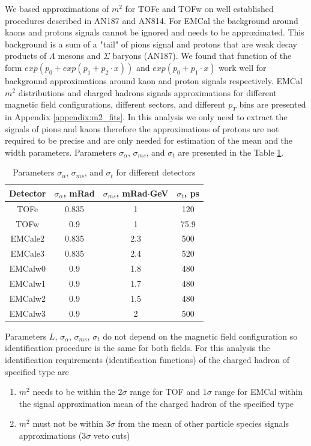 We based approximations of $m^2$ for TOFe and TOFw on well established procedures described in AN187 and AN814. For EMCal the background around kaons and protons signals cannot be ignored and needs to be approximated. This background is a sum of a "tail" of pions signal and protons that are weak decay products of $\Lambda$ mesons and $\Sigma$ baryons (AN187). We found that function of the form $exp(p_0 + exp(p_1 + p_2 \cdot x))$ and $exp(p_0 + p_1 \cdot x)$ work well for background approximations around kaon and proton signals respectively. EMCal $m^2$ distributions and charged hadrons signals approximations for different magnetic field configurations, different sectors, and different $p_T$ bins are presented in Appendix \ref{appendix:m2_fits}. In this analysis we only need to extract the signals of pions and kaons therefore the approximations of protons are not required to be precise and are only needed for estimation of the mean and the width parameters. Parameters $\sigma_\alpha$, $\sigma_{ms}$, and $\sigma_{t}$ are presented in the Table \ref{table:sigma_m2}.

\begin{table}[h!]
	\centering
	\begin{tabular}{c||c|c|c}
		Detector & $\sigma_{\alpha}$, mRad & $\sigma_{ms}$, mRad$\cdot$GeV & $\sigma_{t}$, ps \\
		\hline
		\hline
		TOFe & 0.835 & 1 & 120 \\
		TOFw & 0.9 & 1 & 75.9 \\
		EMCale2 & 0.835 & 2.3 & 500 \\
		EMCale3 & 0.835 & 2.4 & 520 \\
		EMCalw0 & 0.9 & 1.8 & 480 \\
		EMCalw1 & 0.9 & 1.7 & 480 \\
		EMCalw2 & 0.9 & 1.5 & 480 \\
		EMCalw3 & 0.9 & 2 & 500 \\
	\end{tabular}
	\caption{Parameters $\sigma_\alpha$, $\sigma_{ms}$, and $\sigma_{t}$ for different detectors}
	\label{table:sigma_m2}
\end{table}

Parameters $L$, $\sigma_\alpha$, $\sigma_{ms}$, $\sigma_{t}$ do not depend on the magnetic field configuration so identification procedure is the same for both fields. For this analysis the identification requirements (identification functions) of the charged hadron of specified type are
\begin{enumerate}
	\item $m^2$ needs to be within the $2\sigma$ range for TOF and $1\sigma$ range for EMCal within the signal approximation mean of the charged hadron of the specified type
	\item $m^2$ must not be within $3\sigma$ from the mean of other particle species signals approximations ($3\sigma$ veto cuts)
		\label{text:id_func}
\end{enumerate}

